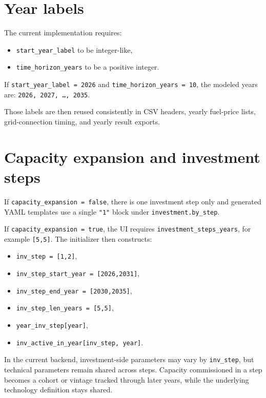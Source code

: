 \documentclass[11pt,a4paper]{report}
\newcommand{\code}[1]{\texttt{#1}}
\begin{document}
\section{Year labels}

The current implementation requires:

\begin{itemize}[leftmargin=1.5em]
  \item \code{start\_year\_label} to be integer-like,
  \item \code{time\_horizon\_years} to be a positive integer.
\end{itemize}

If \code{start\_year\_label = 2026} and \code{time\_horizon\_years = 10}, the modeled years are:
\code{2026, 2027, \dots, 2035}.

Those labels are then reused consistently in CSV headers, yearly fuel-price lists, grid-connection timing, and yearly result exports.

\section{Capacity expansion and investment steps}

If \code{capacity\_expansion = false}, there is one investment step only and generated YAML templates use a single \code{"1"} block under \code{investment.by\_step}.

If \code{capacity\_expansion = true}, the UI requires \code{investment\_steps\_years}, for example \code{[5,5]}. The initializer then constructs:

\begin{itemize}[leftmargin=1.5em]
  \item \code{inv\_step = [1,2]},
  \item \code{inv\_step\_start\_year = [2026,2031]},
  \item \code{inv\_step\_end\_year = [2030,2035]},
  \item \code{inv\_step\_len\_years = [5,5]},
  \item \code{year\_inv\_step[year]},
  \item \code{inv\_active\_in\_year[inv\_step, year]}.
\end{itemize}

\begin{guidenote}
In the current backend, investment-side parameters may vary by \code{inv\_step}, but technical parameters remain shared across steps. Capacity commissioned in a step becomes a cohort or vintage tracked through later years, while the underlying technology definition stays shared.
\end{guidenote}
\end{document}
